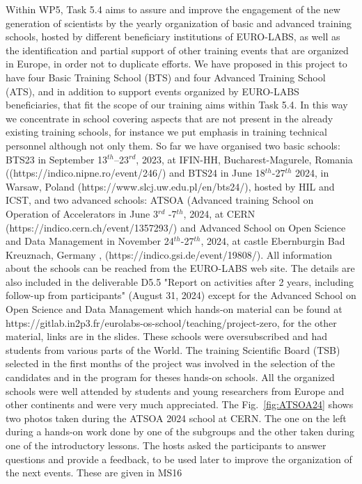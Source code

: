 Within WP5, Task 5.4 aims to assure and improve the engagement of the new generation of scientists by the yearly organization of basic and advanced training schools, hosted by different beneficiary institutions of EURO-LABS, as well as the identification and partial support of other training events that are organized in Europe, in order not to duplicate efforts. We have proposed  in this project to have four Basic Training School (BTS) and four Advanced Training School (ATS), and in addition to support events organized by EURO-LABS beneficiaries, that fit the scope of our training aims within Task 5.4. In this way we concentrate in school covering aspects that are not present in the already existing training schools, for instance we put emphasis in training technical personnel although not only them.
So far we have organised two basic schools: BTS23 in September 13$^{th}$–23$^{rd}$, 2023, at IFIN-HH, Bucharest-Magurele, Romania ((https://indico.nipne.ro/event/246/) and BTS24 in June 18$^{th}$-27$^{th}$ 2024, in Warsaw, Poland (https://www.slcj.uw.edu.pl/en/bts24/), hosted by HIL and ICST, and two advanced schools: ATSOA (Advanced training School on Operation of Accelerators in June 3$^{rd}$ -7$^{th}$, 2024, at CERN (https://indico.cern.ch/event/1357293/) and Advanced School on Open Science and Data Management in November 24$^{th}$-27$^{th}$, 2024, at castle Ebernburgin Bad Kreuznach, Germany , (https://indico.gsi.de/event/19808/). All information about the  schools can be reached from the EURO-LABS web site. The details are also included in the deliverable D5.5 "Report on activities after 2 years, including follow-up from participants" (August 31, 2024) except for the Advanced School on Open Science and Data Management which hands-on material can be found at https://gitlab.in2p3.fr/eurolabs-os-school/teaching/project-zero, for the other material, links are in the slides. These schools were oversubscribed and had students from various parts of the World.  The training Scientific Board (TSB) selected in the first months of the project was involved in the selection of the candidates and in the program for theses hands-on schools. All the organized schools were well attended by students and young researchers from Europe and other continents and were very much appreciated. The Fig.~\ref{fig:ATSOA24} shows two photos taken during the ATSOA 2024 school at CERN. The one on the left during a hands-on work done by one of the subgroups and the other taken during one of the introductory lessons. The hosts asked the participants to answer questions and provide a feedback,  
to be used later to improve the organization of the next events. These are given in MS16

